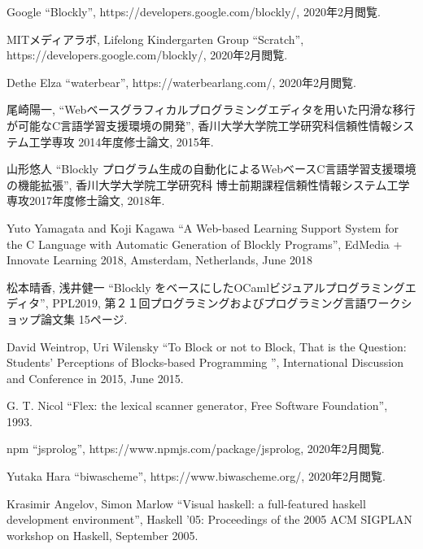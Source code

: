 \documentclass{risepaper}
\begin{document}
\begin{thebibliography}{99} %
                                  
 Google 
 ``Blockly'', https://developers.google.com/blockly/, 2020年2月閲覧.

 MITメディアラボ, Lifelong Kindergarten Group 
 ``Scratch'', https://developers.google.com/blockly/, 2020年2月閲覧.
 
 Dethe Elza
 ``waterbear'', https://waterbearlang.com/, 2020年2月閲覧.

 尾崎陽一,
 ``Webベースグラフィカルプログラミングエディタを用いた円滑な移行が可能なC言語学習支援環境の開発'', 香川大学大学院工学研究科信頼性情報システム工学専攻 2014年度修士論文, 2015年.
 
 山形悠人
 ``Blockly プログラム生成の自動化によるWebベースC言語学習支援環境の機能拡張'', 香川大学大学院工学研究科
博士前期課程信頼性情報システム工学専攻2017年度修士論文, 2018年.

 Yuto Yamagata and Koji Kagawa
 ``A Web-based Learning Support System for the C Language with Automatic Generation of Blockly Programs'', EdMedia + Innovate Learning 2018, Amsterdam, Netherlands, June 2018
 
 松本晴香, 浅井健一
 ``Blockly をベースにしたOCamlビジュアルプログラミングエディタ'', PPL2019, 第２１回プログラミングおよびプログラミング言語ワークショップ論文集 15ページ.
 
 David Weintrop, Uri Wilensky
 ``To Block or not to Block, That is the Question: Students’ Perceptions of Blocks-based Programming
'', International Discussion and Conference in 2015, June 2015.

 G. T. Nicol
 ``Flex: the lexical scanner generator, Free Software Foundation'', 1993.

 npm
 ``jsprolog'', https://www.npmjs.com/package/jsprolog, 2020年2月閲覧.
 
 Yutaka Hara
 ``biwascheme'', https://www.biwascheme.org/, 2020年2月閲覧.
 
 Krasimir Angelov, Simon Marlow
 ``Visual haskell: a full-featured haskell development environment'', Haskell '05: Proceedings of the 2005 ACM SIGPLAN workshop on Haskell, September 2005.

\end{thebibliography}



\insertindex %
\printindex
  
\end{document}
